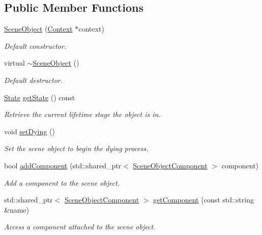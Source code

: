 \subsection*{Public Member Functions}
\begin{DoxyCompactItemize}
\item 
\hyperlink{class_scene_object_a4dc2616525cc46ff3138a6d10f600aad}{Scene\+Object} (\hyperlink{class_context}{Context} $\ast$context)
\begin{DoxyCompactList}\small\item\em Default constructor. \end{DoxyCompactList}\item 
virtual \hyperlink{class_scene_object_ab258d6b94e982d5ae71ad4d7652381f4}{$\sim$\+Scene\+Object} ()
\begin{DoxyCompactList}\small\item\em Default destructor. \end{DoxyCompactList}\item 
\hyperlink{class_scene_object_a3e12c3bc61287395d2fb63c370690dc9}{State} \hyperlink{class_scene_object_a8fd37f24e816c489f7af19510a4b5431}{get\+State} () const 
\begin{DoxyCompactList}\small\item\em Retrieve the current lifetime stage the object is in. \end{DoxyCompactList}\item 
void \hyperlink{class_scene_object_af1ce5eea77fe8015f3eeae73adbe0253}{set\+Dying} ()
\begin{DoxyCompactList}\small\item\em Set the scene object to begin the dying process. \end{DoxyCompactList}\item 
bool \hyperlink{class_scene_object_ab8635d3673dc8a91d71ba18402902314}{add\+Component} (std\+::shared\+\_\+ptr$<$ \hyperlink{class_scene_object_component}{Scene\+Object\+Component} $>$ component)
\begin{DoxyCompactList}\small\item\em Add a component to the scene object. \end{DoxyCompactList}\item 
std\+::shared\+\_\+ptr$<$ \hyperlink{class_scene_object_component}{Scene\+Object\+Component} $>$ \hyperlink{class_scene_object_a08c8437b836366cc1832f92af096ebc0}{get\+Component} (const std\+::string \&name)
\begin{DoxyCompactList}\small\item\em Access a component attached to the scene object. \end{DoxyCompactList}\item 

\end{DoxyCompactItemize}
